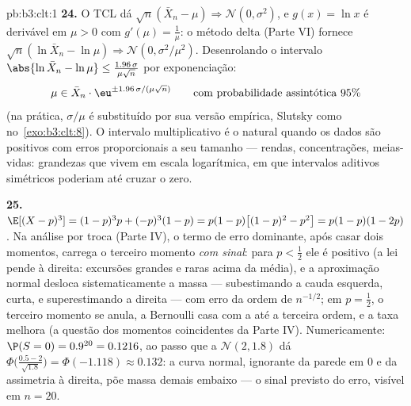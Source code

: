 \begin{solution}{pb:b3:clt:1}
\textbf{24.} O TCL dá $\sqrt n(\bar X_n - \mu)
\Rightarrow \mathcal N(0, \sigma^2)$, e $g(x) = \ln x$ é
derivável em $\mu > 0$ com $g'(\mu) = \frac1\mu$: o
método delta (Parte VI) fornece $\sqrt n(\ln\bar X_n - \ln\mu)
\Rightarrow \mathcal N(0, \sigma^2/\mu^2)$. Desenrolando o
intervalo $\abs{\ln\bar X_n - \ln\mu} \leq
\frac{1.96\,\sigma}{\mu\sqrt n}$ por exponenciação:
\[
\mu \in \bar X_n\cdot
\eu^{\pm1.96\,\sigma/(\mu\sqrt n)}
\qquad\text{com probabilidade assintótica } 95\%
\]
(na prática, $\sigma/\mu$ é substituído por sua versão
empírica, Slutsky como no~\cref{exo:b3:clt:8}). O
intervalo multiplicativo é o natural quando os dados
são positivos com erros proporcionais a seu tamanho ---
rendas, concentrações, meias-vidas: grandezas que vivem
em escala logarítmica, em que intervalos aditivos simétricos poderiam
até cruzar o zero.

\textbf{25.} $\E[(X - p)^3] = (1-p)^3p + (-p)^3(1 - p) =
p(1-p)\bigl[(1-p)^2 - p^2\bigr] = p(1-p)(1 - 2p)$. Na
análise por troca (Parte IV), o termo de erro dominante, após
casar dois momentos, carrega o terceiro momento \emph{com
sinal}: para $p < \frac12$ ele é positivo (a lei pende
à direita: excursões grandes e raras acima da média), e a
aproximação normal desloca sistematicamente a massa ---
subestimando a cauda esquerda, curta, e superestimando a
direita --- com erro da ordem de $n^{-1/2}$; em $p =
\frac12$, o terceiro momento se anula, a Bernoulli casa
com a  até a terceira ordem, e a taxa melhora (a questão
dos momentos coincidentes da Parte IV). Numericamente: $\P(S = 0) =
0.9^{20} = 0.1216$, ao passo que a 
$\mathcal N(2, 1.8)$ dá $\Phi\bigl(\frac{0.5 -
2}{\sqrt{1.8}}\bigr) = \Phi(-1.118) \approx 0.132$: a
curva normal, ignorante da parede em $0$ e da
assimetria à direita, põe massa demais embaixo --- o
sinal previsto do erro, visível em $n = 20$.
\end{solution}
